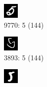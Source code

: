 \documentclass[a4paper,12pt,ngerman,oneside]{scrreprt}	%
\begin{document}
		\begin{figure}[h]
			\vspace{0.0cm} \centering
			\begin{subfigure}[t]{.19\linewidth}
				\centering
				\includegraphics[height=0.6\linewidth]{top5LSTM/5-9770.png}
				\caption{9770: 5 (144)}
			\end{subfigure}
			\begin{subfigure}[t]{.19\linewidth}
				\centering
				\includegraphics[height=0.6\linewidth]{top5LSTM/5-3893.png}
				\caption{3893: 5 (144)}
			\end{subfigure}
			\begin{subfigure}[t]{.19\linewidth}
				\centering
				\includegraphics[height=0.6\linewidth]{top5LSTM/5-2573.png}

\end{subfigure}
\end{figure}
\end{document}
